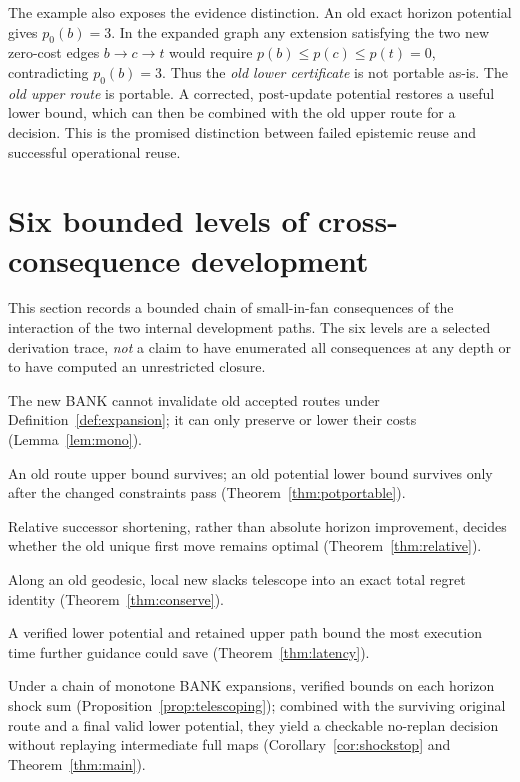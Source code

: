 \documentclass[11pt]{article}
\theoremstyle{definition}\newtheorem{definition}[theorem]{Definition}\newtheorem{assumption}[theorem]{Assumption}
\theoremstyle{remark}\newtheorem{remark}[theorem]{Remark}
\begin{document}
The example also exposes the evidence distinction. An old exact horizon potential gives $p_0(b)=3$. In the expanded graph any extension satisfying the two new zero-cost edges $b\to c\to t$ would require $p(b)\leq p(c)\leq p(t)=0$, contradicting $p_0(b)=3$. Thus the \emph{old lower certificate} is not portable as-is. The \emph{old upper route} is portable. A corrected, post-update potential restores a useful lower bound, which can then be combined with the old upper route for a decision. This is the promised distinction between failed epistemic reuse and successful operational reuse.

\section{Six bounded levels of cross-consequence development}
\label{sec:levels}
This section records a bounded chain of small-in-fan consequences of the interaction of the two internal development paths. The six levels are a selected derivation trace, \emph{not} a claim to have enumerated all consequences at any depth or to have computed an unrestricted closure.

\begin{description}[style=nextline,leftmargin=1.7cm,itemsep=5pt]
\item[Level $+1$ --- Monotone route retention.] The new BANK cannot invalidate old accepted routes under Definition~\ref{def:expansion}; it can only preserve or lower their costs (Lemma~\ref{lem:mono}).
\item[Level $+2$ --- Separation of certificate types.] An old route upper bound survives; an old potential lower bound survives only after the changed constraints pass (Theorem~\ref{thm:potportable}).
\item[Level $+3$ --- Local geodesic portability.] Relative successor shortening, rather than absolute horizon improvement, decides whether the old unique first move remains optimal (Theorem~\ref{thm:relative}).
\item[Level $+4$ --- Path-wide shock conservation.] Along an old geodesic, local new slacks telescope into an exact total regret identity (Theorem~\ref{thm:conserve}).
\item[Level $+5$ --- Evidence-price comparison.] A verified lower potential and retained upper path bound the most execution time further guidance could save (Theorem~\ref{thm:latency}).
\item[Level $+6$ --- Repeated-deposit economy.] Under a chain of monotone BANK expansions, verified bounds on each horizon shock sum (Proposition~\ref{prop:telescoping}); combined with the surviving original route and a final valid lower potential, they yield a checkable no-replan decision without replaying intermediate full maps (Corollary~\ref{cor:shockstop} and Theorem~\ref{thm:main}).
\end{description}
\end{document}
